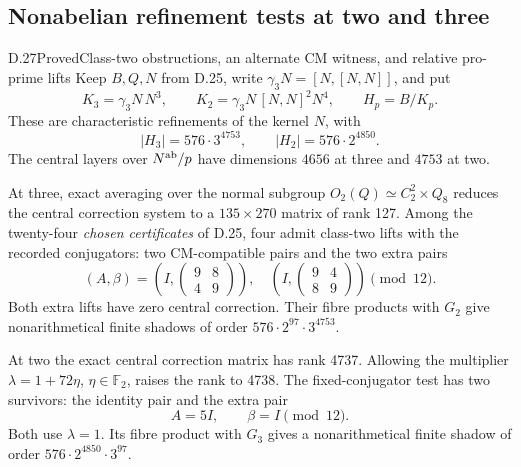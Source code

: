 \subsection{Nonabelian refinement tests at two and three}

\begin{statement}{D.27}{Proved}{Class-two obstructions, an alternate CM witness, and relative pro-prime lifts}
Keep $B,Q,N$ from D.25, write $\gamma_3N=[N,[N,N]]$, and put
\[
 K_3=\gamma_3N\,N^3,\qquad
 K_2=\gamma_3N\,[N,N]^2N^4,\qquad H_p=B/K_p.             \tag{D.27.1}
\]
These are characteristic refinements of the kernel $N$,
with
\[
 |H_3|=576\cdot3^{4753},\qquad
 |H_2|=576\cdot2^{4850}.                                \tag{D.27.2}
\]
The central layers over $N^{\rm ab}/p$ have dimensions
$4656$ at three and $4753$ at two.

At three, exact averaging over the normal subgroup
$O_2(Q)\simeq C_2^2\times Q_8$ reduces the central correction
system to a $135\times270$ matrix of rank 127. Among the
twenty-four \emph{chosen certificates} of D.25, four admit
class-two lifts with the recorded conjugators: two
CM-compatible pairs and the two extra pairs
\[
 (A,\beta)=\left(I,\begin{pmatrix}9&8\\4&9\end{pmatrix}\right),
 \quad
 \left(I,\begin{pmatrix}9&4\\8&9\end{pmatrix}\right)
 \pmod{12}.                                             \tag{D.27.3}
\]
Both extra lifts have zero central correction. Their fibre
products with $G_2$ give nonarithmetical finite shadows of
order $576\cdot2^{97}\cdot3^{4753}$.

At two the exact central correction matrix has rank 4737.
Allowing the multiplier $\lambda=1+72\eta$, $\eta\in\mathbb F_2$,
raises the rank to 4738. The fixed-conjugator test has two
survivors: the identity pair and the extra pair
\[
                  A=5I,\qquad\beta=I\pmod{12}.          \tag{D.27.4}
\]
Both use $\lambda=1$. Its fibre product with $G_3$ gives a
nonarithmetical finite shadow of order
$576\cdot2^{4850}\cdot3^{97}$.


\end{statement}
